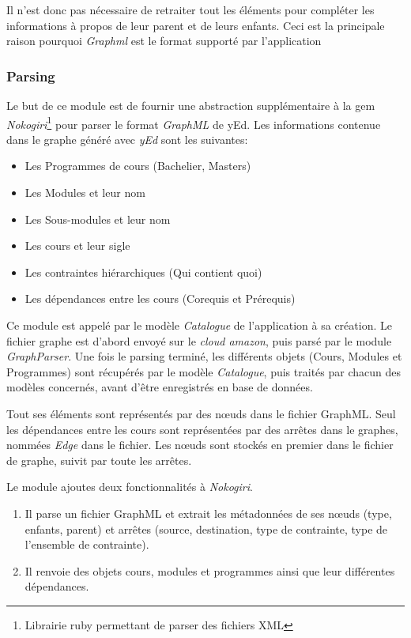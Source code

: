 Il n'est donc pas nécessaire de retraiter tout les éléments pour compléter les informations à propos de leur parent et de leurs enfants. Ceci est la principale raison pourquoi \textit{Graphml} est le format supporté par l'application


\subsubsection{Parsing}
\label{graph_parsing}
Le but de ce module est de fournir une abstraction supplémentaire à la gem \textit{Nokogiri}\footnote{Librairie ruby permettant de parser des fichiers XML} pour parser le format \textit{GraphML} de yEd. Les informations contenue dans le graphe généré avec \textit{yEd} sont les suivantes:
\begin{itemize}
\item Les Programmes de cours (Bachelier, Masters)
\item Les Modules et leur nom
\item Les Sous-modules et leur nom
\item Les cours et leur sigle
\item Les contraintes hiérarchiques (Qui contient quoi)
\item Les dépendances entre les cours (Corequis et Prérequis)
\end{itemize}

Ce module est appelé par le modèle \textit{Catalogue} de l'application à sa création. Le fichier graphe est d'abord envoyé sur le  \textit{cloud amazon}, puis parsé par le module \textit{GraphParser}. Une fois le parsing terminé, les différents objets (Cours, Modules et Programmes) sont récupérés par le modèle \textit{Catalogue}, puis traités par chacun des modèles concernés, avant d'être enregistrés en base de données. 

Tout ses éléments sont représentés par des nœuds dans le fichier GraphML. Seul les dépendances entre les cours sont représentées par des arrêtes dans le graphes, nommées \textit{Edge} dans le fichier. Les nœuds sont stockés en premier dans le fichier de graphe, suivit par toute les arrêtes. 

Le module ajoutes deux fonctionnalités à \textit{Nokogiri}.
\begin{enumerate}
  \item Il parse un fichier GraphML et extrait les métadonnées de ses nœuds (type, enfants, parent) et arrêtes (source, destination, type de contrainte, type de l'ensemble de contrainte). 
  \item Il renvoie des objets cours, modules et programmes ainsi que leur différentes dépendances.  
\end{enumerate}

